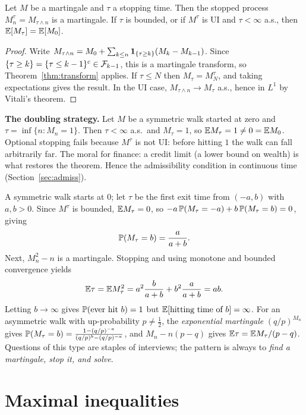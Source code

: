 \begin{theorem}\label{thm:ost}
Let $M$ be a martingale and $\tau$ a stopping time. Then the stopped process $M^\tau_n=M_{\tau\wedge n}$ is a martingale. If $\tau$ is bounded, or if $M^\tau$ is UI and $\tau<\infty$ a.s., then $\mathbb{E}[M_\tau]=\mathbb{E}[M_0]$.
\end{theorem}
\begin{proof}
Write $M_{\tau\wedge n}=M_0+\sum_{k\le n}\mathbf{1}_{\{\tau\ge k\}}(M_k-M_{k-1})$. Since $\{\tau\ge k\}=\{\tau\le k-1\}^c\in\mathcal{F}_{k-1}$, this is a martingale transform, so Theorem~\ref{thm:transform} applies. If $\tau\le N$ then $M_\tau=M^\tau_N$, and taking expectations gives the result. In the UI case, $M_{\tau\wedge n}\to M_\tau$ a.s., hence in $L^1$ by Vitali's theorem.
\end{proof}

\begin{pitfall}
\textbf{The doubling strategy.} Let $M$ be a symmetric walk started at zero and $\tau=\inf\{n:M_n=1\}$. Then $\tau<\infty$ a.s.\ and $M_\tau=1$, so $\mathbb{E} M_\tau=1\ne0=\mathbb{E} M_0$. Optional stopping fails because $M^\tau$ is not UI: before hitting $1$ the walk can fall arbitrarily far. The moral for finance: a credit limit (a lower bound on wealth) is what restores the theorem. Hence the admissibility condition in continuous time (Section~\ref{sec:admiss}).
\end{pitfall}

\begin{example}\label{ex:ruin}
A symmetric walk starts at $0$; let $\tau$ be the first exit time from $(-a,b)$ with $a,b>0$. Since $M^\tau$ is bounded, $\mathbb{E} M_\tau=0$, so $-a\,\mathbb{P}(M_\tau=-a)+b\,\mathbb{P}(M_\tau=b)=0$, giving
\[
\mathbb{P}(M_\tau=b)=\frac{a}{a+b}.
\]
Next, $M_n^2-n$ is a martingale. Stopping and using monotone and bounded convergence yields
\[
\mathbb{E}\tau=\mathbb{E} M_\tau^2=a^2\frac{b}{a+b}+b^2\frac{a}{a+b}=ab.
\]
Letting $b\to\infty$ gives $\mathbb{P}(\text{ever hit }b)=1$ but $\mathbb{E}[\text{hitting time of }b]=\infty$. For an asymmetric walk with up-probability $p\neq\tfrac12$, the \emph{exponential martingale} $(q/p)^{M_n}$ gives $\mathbb{P}(M_\tau=b)=\frac{1-(q/p)^{-a}}{(q/p)^{b}-(q/p)^{-a}}$, and $M_n-n(p-q)$ gives $\mathbb{E}\tau=\mathbb{E} M_\tau/(p-q)$. Questions of this type are staples of interviews; the pattern is always to \emph{find a martingale, stop it, and solve}.
\end{example}

\section{Maximal inequalities}

